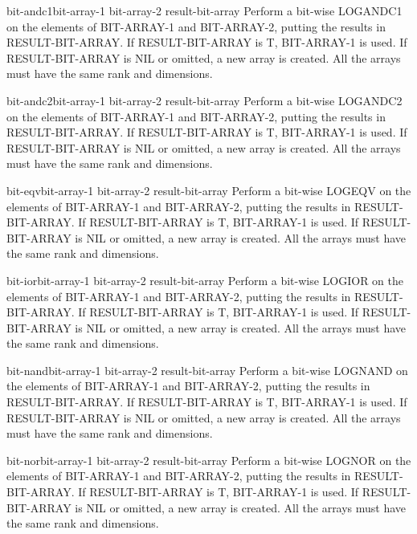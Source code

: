 \documentclass[10pt,english]{book}
\begin{document}
\begin{function}{bit-andc1}{bit-array-1 bit-array-2 \op result-bit-array}
  Perform a bit-wise LOGANDC1 on the elements of BIT-ARRAY-1 and BIT-ARRAY-2,
  putting the results in RESULT-BIT-ARRAY. If RESULT-BIT-ARRAY is T,
  BIT-ARRAY-1 is used. If RESULT-BIT-ARRAY is NIL or omitted, a new array is
  created. All the arrays must have the same rank and dimensions.
\end{function}

\begin{function}{bit-andc2}{bit-array-1 bit-array-2 \op result-bit-array}
  Perform a bit-wise LOGANDC2 on the elements of BIT-ARRAY-1 and BIT-ARRAY-2,
  putting the results in RESULT-BIT-ARRAY. If RESULT-BIT-ARRAY is T,
  BIT-ARRAY-1 is used. If RESULT-BIT-ARRAY is NIL or omitted, a new array is
  created. All the arrays must have the same rank and dimensions.
\end{function}

\begin{function}{bit-eqv}{bit-array-1 bit-array-2 \op result-bit-array}
  Perform a bit-wise LOGEQV on the elements of BIT-ARRAY-1 and BIT-ARRAY-2,
  putting the results in RESULT-BIT-ARRAY. If RESULT-BIT-ARRAY is T,
  BIT-ARRAY-1 is used. If RESULT-BIT-ARRAY is NIL or omitted, a new array is
  created. All the arrays must have the same rank and dimensions.
\end{function}

\begin{function}{bit-ior}{bit-array-1 bit-array-2 \op result-bit-array}
  Perform a bit-wise LOGIOR on the elements of BIT-ARRAY-1 and BIT-ARRAY-2,
  putting the results in RESULT-BIT-ARRAY. If RESULT-BIT-ARRAY is T,
  BIT-ARRAY-1 is used. If RESULT-BIT-ARRAY is NIL or omitted, a new array is
  created. All the arrays must have the same rank and dimensions.
\end{function}

\begin{function}{bit-nand}{bit-array-1 bit-array-2 \op result-bit-array}
  Perform a bit-wise LOGNAND on the elements of BIT-ARRAY-1 and BIT-ARRAY-2,
  putting the results in RESULT-BIT-ARRAY. If RESULT-BIT-ARRAY is T,
  BIT-ARRAY-1 is used. If RESULT-BIT-ARRAY is NIL or omitted, a new array is
  created. All the arrays must have the same rank and dimensions.
\end{function}

\begin{function}{bit-nor}{bit-array-1 bit-array-2 \op result-bit-array}
  Perform a bit-wise LOGNOR on the elements of BIT-ARRAY-1 and BIT-ARRAY-2,
  putting the results in RESULT-BIT-ARRAY. If RESULT-BIT-ARRAY is T,
  BIT-ARRAY-1 is used. If RESULT-BIT-ARRAY is NIL or omitted, a new array is
  created. All the arrays must have the same rank and dimensions.
\end{function}
\end{document}
